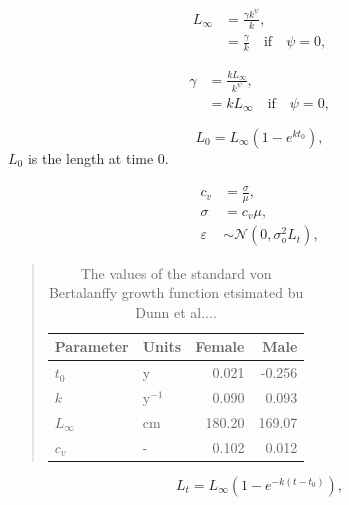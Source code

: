 \documentclass[11pt, a4paper]{article}
\begin{document}
\begin{align}
  L_\infty &= \frac{\gamma k^\psi}{k},\\
  &= \frac{\gamma}{k} \quad \text{if} \quad \psi = 0, 
\end{align}

\begin{align}
  \gamma &= \frac{k L_\infty}{k^\psi},\\
  &= k L_\infty \quad \text{if} \quad \psi = 0, 
\end{align}


\begin{equation}
  L_0 = L_\infty \left( 1 - e^{k t_0} \right),
\end{equation}
$L_0$ is the length at time 0.

\begin{align}
  c_v &= \frac{\sigma}{\mu},\\
  \sigma &= c_v \mu,\\
  \varepsilon &\sim \mathcal{N} \left( 0, \sigma^2_o L_t \right),
\end{align}


\begin{table}[!htbp]
  \begin{quote}
    \caption{\label{tab:Dunn} The values of the standard von Bertalanffy growth
      function etsimated bu Dunn et al....} \small{
      \begin{center}
        \begin{tabular}{|ll|rr|}
          \hline
          Parameter & Units          & Female & Male\\
          \hline \hline
          $t_0$     & y              & 0.021 & -0.256\\
          $k$       & $\text{y}^{-1}$ & 0.090 & 0.093\\
          $L_\infty$ & cm              & 180.20 & 169.07\\
          $c_v$     & -               & 0.102 & 0.012\\
          \hline
        \end{tabular}
      \end{center}
    }
  \end{quote}
\end{table}

\begin{equation}
  L_t = L_\infty \left( 1 - e^{-k (t - t_0)} \right),
\end{equation}


\newpage\clearpage
\end{document}
